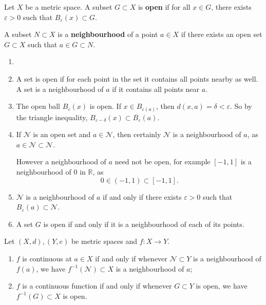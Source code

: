 \documentclass[12pt]{article}
\begin{document}
\begin{definition}
	Let $X$ be a metric space. A subset $G \subset X$ is \textbf{open} if for all $x \in G$, there exists $\varepsilon > 0$ such that $B_{\varepsilon}(x) \subset G$.

	A subset $N \subset X$ is a \textbf{neighbourhood} of a point $a \in X$ if there exists an open set $G \subset X$ such that $a \in G \subset N$.
\end{definition}

\begin{remark}
	\begin{enumerate}[1.]
		\item[]
		\item A set is open if for each point in the set it contains all points nearby as well. A set is a neighbourhood of $a$ if it contains all points near $a$.
		\item The open ball $B_{\varepsilon}(x)$ is open. If $x \in B_{\varepsilon(a)}$, then $d(x, a) = \delta < \varepsilon$. So by the triangle inequality, $B_{\varepsilon - \delta}(x) \subset B_{\varepsilon}(a)$.
		\item If $\mathcal{N}$ is an open set and $a \in \mathcal{N}$, then certainly $\mathcal{N}$ is a neighbourhood of $a$, as $a \in \mathcal{N} \subset \mathcal{N}$.

			However a neighbourhood of $a$ need not be open, for example $[-1, 1]$ is a neighbourhood of $0$ in $\mathbb{R}$, as
			\[
				0 \in (-1, 1) \subset [-1, 1]
			.\]
		\item $\mathcal{N}$ is a neighbourhood of $a$ if and only if there exists $\varepsilon > 0$ such that $B_{\varepsilon}(a) \subset \mathcal{N}$.
		\item A set $G$ is open if and only if it is a neighbourhood of each of its points.
	\end{enumerate}
\end{remark}

\begin{proposition}
	Let $(X, d), (Y, e)$ be metric spaces and $f : X \to Y$.
	\begin{enumerate}[\normalfont(i)]
		\item $f$ is continuous at $a \in X$ if and only if whenever $\mathcal{N} \subset Y$ is a neighbourhood of $f(a)$, we have $f^{-1}(\mathcal{N}) \subset X$ is a neighbourhood of $a$;
		\item $f$ is a continuous function if and only if whenever $G \subset Y$ is open, we have $f^{-1}(G) \subset X$ is open.
	\end{enumerate}
\end{proposition}
\end{document}
